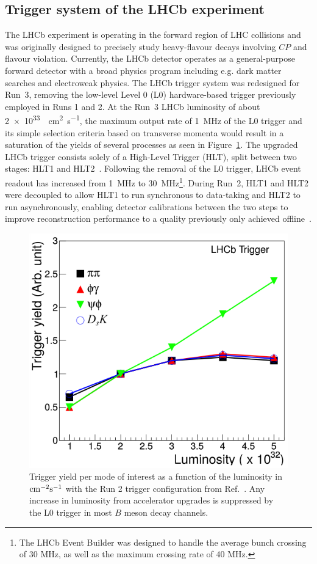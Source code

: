 \subsection{Trigger system of the LHCb experiment}

The LHCb experiment is operating in the forward region of LHC collisions and was originally designed to precisely study heavy-flavour decays involving $CP$ and flavour violation. Currently, the LHCb detector operates as a general-purpose forward detector with a broad physics program including e.g. dark matter searches and electroweak physics. The LHCb trigger system was redesigned for Run~3, removing the low-level Level 0 (L0) hardware-based trigger previously employed in Runs 1 and 2. At the Run~3 LHCb luminosity of about \SI{2e33}{\per\square\cm\per\second}, the maximum output rate of \SI{1}{\mega\hertz} of the L0 trigger and its simple selection criteria based on transverse momenta would result in a saturation of the yields of several processes as seen in Figure~\ref{fig:LHCbL0TriggerYield}. The upgraded LHCb trigger consists solely of a High-Level Trigger (HLT), split between two stages: HLT1 and HLT2~\cite{Aaij:2019uij}. Following the removal of the L0 trigger, LHCb event readout has increased from \SI{1}{\mega\hertz} to \SI{30}{\mega\hertz}\footnote{The LHCb Event Builder was designed to handle the average bunch crossing of 30 MHz, as well as the maximum crossing rate of 40 MHz.}. During Run~2, HLT1 and HLT2 were decoupled to allow HLT1 to run synchronous to data-taking and HLT2 to run asynchronously, enabling detector calibrations between the two steps to improve reconstruction performance to a quality previously only achieved offline~\cite{LHCb:Albrecht_2015}. 

\begin{figure}[h!]
    \centering
    \includegraphics[width=0.55\linewidth]{images/lhcb/LHCb-L0-yield.png}
    \caption{Trigger yield per mode of interest as a function of the luminosity in ${\rm cm}^{-2}{\rm s}^{-1}$ with the Run 2 trigger configuration from Ref.~\cite{LHCb:upgrade-piucci}. Any increase in luminosity from accelerator upgrades is suppressed by the L0 trigger in most $B$ meson decay channels.}
    \label{fig:LHCbL0TriggerYield}
\end{figure}

